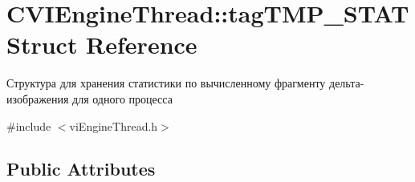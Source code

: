 \hypertarget{struct_c_v_i_engine_thread_1_1tag_t_m_p___s_t_a_t}{\section{C\+V\+I\+Engine\+Thread\+:\+:tag\+T\+M\+P\+\_\+\+S\+T\+A\+T Struct Reference}
\label{struct_c_v_i_engine_thread_1_1tag_t_m_p___s_t_a_t}
}


Структура для хранения статистики по вычисленному фрагменту дельта-\/изображения для одного процесса  




{\ttfamily \#include $<$vi\+Engine\+Thread.\+h$>$}

\subsection*{Public Attributes}
